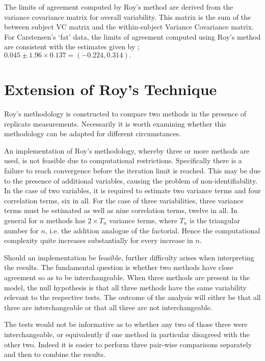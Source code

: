 \documentclass[12pt, a4paper]{report}
\theoremstyle{plain}
\theoremstyle{definition}
\theoremstyle{remark}
\begin{document}
The limits of agreement computed by Roy's method are derived from the variance covariance matrix for overall variability.
This matrix is the sum of the between subject VC matrix and the within-subject Variance Covariance matrix.
For Carstensen's `fat' data, the limits of agreement computed using Roy's
method are consistent with the estimates given by \citet{BXC2008}; $0.045  \pm 1.96 \times  0.137 = (-0.224,  0.314).$








\section{Extension of Roy's Technique}
Roy's methodology is constructed to compare two methods in the presence of replicate measurements. Necessarily it is worth examining whether this methodology can be adapted for different circumstances.

An implementation of Roy's methodology, whereby three or more methods are used, is not feasible due to computational restrictions. Specifically there is a failure to reach convergence before the iteration limit is reached. This may be due to the presence of additional variables, causing the problem of non-identifiability. In the case of two variables, it is required to estimate two variance terms and four correlation terms, six in all. For the case of three variabilities, three variance terms must be estimated as well as nine correlation terms, twelve in all. In general for $n$ methods has $2 \times T_{n}$ variance terms, where $T_n$ is the triangular number for $n$, i.e. the addition analogue of the factorial. Hence the computational complexity quite increases substantially for every increase in $n$.

Should an implementation be feasible, further difficulty arises when interpreting the results. The fundamental question is whether two methods have close agreement so as to be interchangeable. When three methods are present in the model, the null hypothesis is that all three methods have the same variability relevant to the respective tests. The outcome of the analysis will either be that all three are interchangeable or that all three are not interchangeable.

The tests would not be informative as to whether any two of those three were interchangeable, or equivalently if one method in particular disagreed with the other two. Indeed it is easier to perform three pair-wise comparisons separately and then to combine the results.
\end{document}
